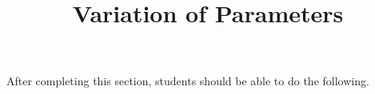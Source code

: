 \documentclass{ximera}
\title{Variation of Parameters}
\begin{document}
\begin{abstract}
\end{abstract}

\maketitle

\begin{sectionOutcomes}

After completing this section, students should be able to do the following.

\begin{itemize}
	
\end{itemize}

\end{sectionOutcomes}
\end{document}
